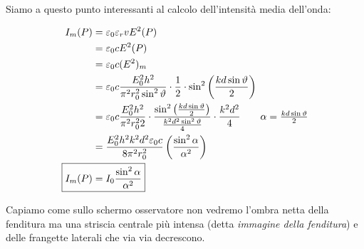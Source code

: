 Siamo a questo punto interessanti al calcolo dell'intensità media dell'onda:

\begin{align*}
	I_m(P) &= \varepsilon_0 \varepsilon_r vE^2 (P) \\
	&= \varepsilon_0 c E^2 (P) \\
	&= \varepsilon_0 c(E^2)_m \\
	&= \varepsilon_0 c \frac{E_0^2 h^2}{\pi^2 r_0^2 \sin^2 \vartheta} \cdot \frac{1}{2} \cdot \sin^2 \left( \frac{kd\sin \vartheta}{2} \right) \\
	&= \varepsilon_0 c \frac{E_0^2 h^2}{\pi^2 r_0^2 2} \cdot  \frac{\sin^2 \left( \frac{kd\sin \vartheta}{2} \right)}{\frac{k^2 d^2 \sin^2 \vartheta}{4}} \cdot \frac{k^2 d^2}{4} \tag*{$\alpha=\frac{kd\sin \vartheta}{2}$} \\
	&= \frac{E_0^2 h^2 k^2 d^2 \varepsilon_0 c}{8\pi^2 r_0^2} \left( \frac{\sin^2 \alpha}{\alpha^2} \right) \\
	\Aboxed{I_m(P) &= I_0\frac{\sin^2 \alpha}{\alpha^2}}
\end{align*}

Capiamo come sullo schermo osservatore non vedremo l'ombra netta della fenditura ma una striscia centrale più intensa (detta \emph{immagine della fenditura}) e delle frangette laterali che via via decrescono.

